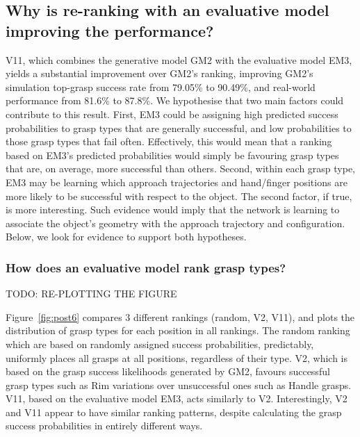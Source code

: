 \subsection{Why is re-ranking with an evaluative model improving the performance?}
\noindent

V11, which combines the generative model GM2 with the evaluative model EM3, yields a substantial improvement over GM2's ranking, improving GM2's simulation top-grasp success rate from 79.05\% to 90.49\%, and real-world performance from 81.6\% to 87.8\%. We hypothesise that two main factors could contribute to this result. First, EM3 could be assigning high predicted success probabilities to grasp types that are generally successful, and low probabilities to those grasp types that fail often. Effectively, this would mean that a ranking based on EM3's predicted probabilities would simply be favouring grasp types that are, on average, more successful than others. Second, within each grasp type, EM3 may be learning which approach trajectories and hand/finger positions are more likely to be successful with respect to the object. The second factor, if true, is more interesting. Such evidence would imply that the network is learning to associate the object's geometry with the approach trajectory and configuration. Below, we look for evidence to support both hypotheses.

\subsubsection{How does an evaluative model rank grasp types?}
\noindent


TODO: RE-PLOTTING THE FIGURE

Figure~\ref{fig:post6} compares 3 different rankings (random, V2, V11), and plots the distribution of grasp types for each position in all rankings. The random ranking which are based on randomly assigned success probabilities, predictably, uniformly places all grasps at all positions, regardless of their type. V2, which is based on the grasp success likelihoods generated by GM2, favours successful grasp types such as Rim variations over unsuccessful ones such as Handle grasps. V11, based on the evaluative model EM3, acts similarly to V2. Interestingly, V2 and V11 appear to have similar ranking patterns, despite calculating the grasp success probabilities in entirely different ways. 


